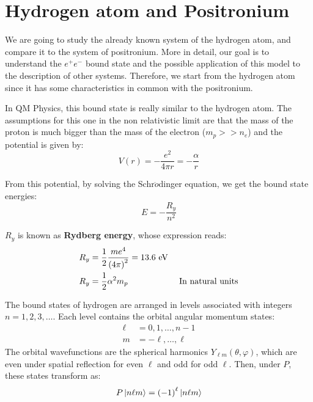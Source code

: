\documentclass[../../main/main.tex]{subfiles}
\begin{document}
\section{Hydrogen atom and Positronium}
We are going to study the already known system of the hydrogen atom, and compare it to the system of positronium. More in detail, our goal is to understand the \( e^+ e^- \) bound state and the possible application of this model to the description of other systems. Therefore, we start from the hydrogen atom since it has some characteristics in common with the positronium.

In QM Physics, this bound state is really similar to the hydrogen atom. The assumptions for this one in the non relativistic limit are that the mass of the proton is much bigger than the mass of the electron (\( m_p >> n_e \)) and the potential is given by:
\begin{equation}
    V(r)
    =
    - \frac{e^2}{4 \pi r}
    =
    - \frac{\alpha}{r}
    \label{eq:L02_HAP}
\end{equation}

From this potential, by solving the Schr$\ddot{o}$dinger equation, we get the bound state energies:
\begin{equation}
    E
    =
    - \frac{R_y}{n^2}
    \label{eq:L02_HAE}
\end{equation}

\( R_y \) is known as \textbf{Rydberg energy}, whose expression reads:
\begin{align}
    R_y &= \frac{1}{2} \frac{me^4}{\qty(4\pi)^2} = 13.6 \ \si{eV} \label{eq:L02_HARE} \\
    R_y &= \frac{1}{2} \alpha^2 m_p \qquad \qquad \qquad \text{In natural units} \label{eq:L02_HARENU}
\end{align}

The bound states of hydrogen are arranged in levels associated with integers \( n = 1,2,3, \dots \). Each level contains the orbital angular momentum states:
\begin{equation}
    \begin{aligned}
        \ell &= 0, 1, \dots, n-1 \\
        m    &= -\ell, \dots, \ell
    \end{aligned}
    \label{eq:L02_HAREMS}
\end{equation}
The orbital wavefunctions are the spherical harmonics \( Y_{\ell m}(\theta, \varphi) \), which are even under spatial reflection for even \( \ell \) and odd for odd \( \ell \). Then, under \( P \), these states transform as:
\begin{equation}
    P \ket{n \ell m} = \qty(-1)^{\ell} \ket{n \ell m}
    \label{eq:L02_HAWFP}
\end{equation}
\end{document}
